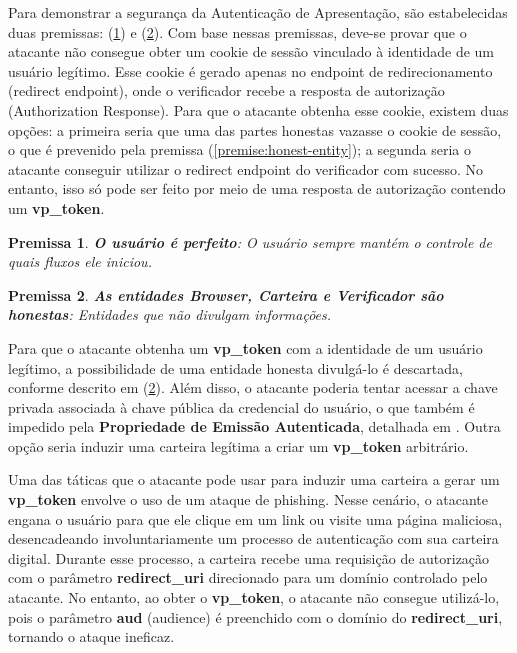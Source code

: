 Para demonstrar a segurança da Autenticação de Apresentação, são estabelecidas duas premissas: (\ref{premise:perfect-user}) e (\ref{premise:honest-entity}). Com base nessas premissas, deve-se provar que o atacante não consegue obter um cookie de sessão vinculado à identidade de um usuário legítimo. Esse cookie é gerado apenas no endpoint de redirecionamento (redirect endpoint), onde o verificador recebe a resposta de autorização (Authorization Response). Para que o atacante obtenha esse cookie, existem duas opções: a primeira seria que uma das partes honestas vazasse o cookie de sessão, o que é prevenido pela premissa (\autoref{premise:honest-entity}); a segunda seria o atacante conseguir utilizar o redirect endpoint do verificador com sucesso. No entanto, isso só pode ser feito por meio de uma resposta de autorização contendo um \textbf{vp\_token}.


\newtheorem{premise}{Premissa}
\begin{premise}
    \textbf{O usuário é perfeito}\label{premise:perfect-user}: O usuário sempre mantém o controle de quais fluxos ele iniciou.
\end{premise}

\begin{premise}
    \textbf{As entidades Browser, Carteira e Verificador são honestas}\label{premise:honest-entity}: Entidades que não divulgam informações.
\end{premise}

Para que o atacante obtenha um \textbf{vp\_token} com a identidade de um usuário legítimo, a possibilidade de uma entidade honesta divulgá-lo é descartada, conforme descrito em (\ref{premise:honest-entity}). Além disso, o atacante poderia tentar acessar a chave privada associada à chave pública da credencial do usuário, o que também é impedido pela \textbf{Propriedade de Emissão Autenticada}, detalhada em \cite{hauck2023openid}. Outra opção seria induzir uma carteira legítima a criar um \textbf{vp\_token} arbitrário.

Uma das táticas que o atacante pode usar para induzir uma carteira a gerar um \textbf{vp\_token} envolve o uso de um ataque de phishing. Nesse cenário, o atacante engana o usuário para que ele clique em um link ou visite uma página maliciosa, desencadeando involuntariamente um processo de autenticação com sua carteira digital. Durante esse processo, a carteira recebe uma requisição de autorização com o parâmetro \textbf{redirect\_uri} direcionado para um domínio controlado pelo atacante. No entanto, ao obter o \textbf{vp\_token}, o atacante não consegue utilizá-lo, pois o parâmetro \textbf{aud} (audience) é preenchido com o domínio do \textbf{redirect\_uri}, tornando o ataque ineficaz.


